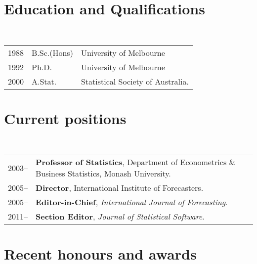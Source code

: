\documentclass[a4paper,10pt]{article}
\begin{document}
\maketitle

\section{Education and Qualifications}

~\begin{tabular}{lll}
1988 & B.Sc.(Hons) & University of Melbourne\\
1992 & Ph.D. & University of Melbourne\\
2000 & A.Stat. & Statistical Society of Australia.
\end{tabular}


\section{Current positions}

~\begin{tabular}{lP{15cm}}
2003--& \textbf{Professor of Statistics},
        Department of Econometrics \& Business Statistics, Monash University.\\
2005--& \textbf{Director},
        International Institute of Forecasters.\\
2005--& \textbf{Editor-in-Chief},
        \textit{International Journal of Forecasting}.\\
2011--& \textbf{Section Editor}, \textit{Journal of Statistical Software}.
\end{tabular}



\section{Recent honours and awards}
\end{document}
